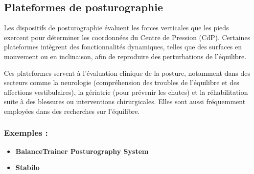 \subsection{Plateformes de posturographie}

Les dispositifs de posturographie évaluent les forces verticales que les pieds exercent pour déterminer les coordonnées du Centre de Pression (CdP).
Certaines plateformes intègrent des fonctionnalités dynamiques, telles que des surfaces en mouvement ou en inclinaison, afin de reproduire des perturbations de l'équilibre.

Ces plateformes servent à l'évaluation clinique de la posture, notamment dans des secteurs comme la neurologie (compréhension des troubles de l'équilibre et des affections vestibulaires), la gériatrie (pour prévenir les chutes) et la réhabilitation suite à des blessures ou interventions chirurgicales. Elles sont aussi fréquemment employées dans des recherches sur l'équilibre.

\subsubsection{Exemples :}
\begin{itemize}
  \item \textbf{BalanceTrainer Posturography System}
  \item \textbf{Stabilo}
\end{itemize}

